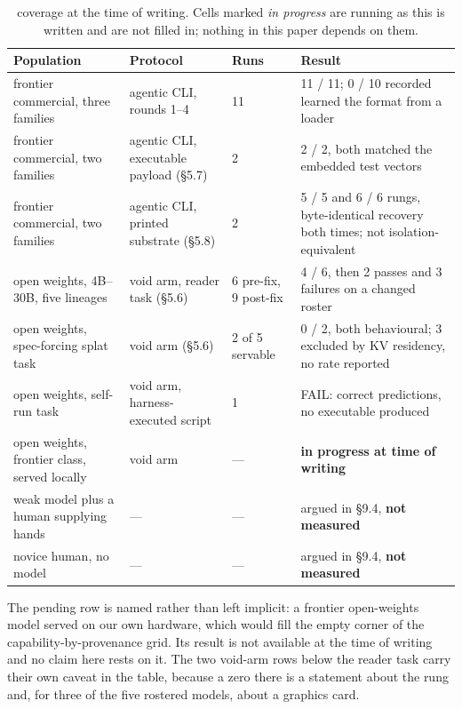 \documentclass[10pt,twocolumn,letterpaper]{article}
\begin{document}
\begin{table}[t]\centering\footnotesize
\caption{coverage at the time of writing. Cells marked \emph{in progress} are running as this is written and are not filled in; nothing in this paper depends on them.}
\begin{tabular}{@{}L{3.4cm} L{2.6cm} L{2.4cm} L{4.4cm}@{}}
\toprule
Population & Protocol & Runs & Result \\
\midrule
frontier commercial, three families & agentic CLI, rounds 1--4 & 11 & 11 / 11; 0 / 10 recorded learned the format from a loader \\
frontier commercial, two families & agentic CLI, executable payload (\S5.7) & 2 & 2 / 2, both matched the embedded test vectors \\
frontier commercial, two families & agentic CLI, printed substrate (\S5.8) & 2 & 5 / 5 and 6 / 6 rungs, byte-identical recovery both times; not isolation-equivalent \\
open weights, 4B--30B, five lineages & void arm, reader task (\S5.6) & 6 pre-fix, 9 post-fix & 4 / 6, then 2 passes and 3 failures on a changed roster \\
open weights, spec-forcing splat task & void arm (\S5.6) & 2 of 5 servable & 0 / 2, both behavioural; 3 excluded by KV residency, no rate reported \\
open weights, self-run task & void arm, harness-executed script & 1 & FAIL: correct predictions, no executable produced \\
open weights, frontier class, served locally & void arm & --- & \textbf{in progress at time of writing} \\
weak model plus a human supplying hands & --- & --- & argued in \S9.4, \textbf{not measured} \\
novice human, no model & --- & --- & argued in \S9.4, \textbf{not measured} \\
\bottomrule
\end{tabular}
\end{table}

The pending row is named rather than left implicit: a frontier open-weights model served on our own hardware, which would fill the empty corner of the capability-by-provenance grid. Its result is not available at the time of writing and no claim here rests on it. The two void-arm rows below the reader task carry their own caveat in the table, because a zero there is a statement about the rung and, for three of the five rostered models, about a graphics card.
\end{document}
